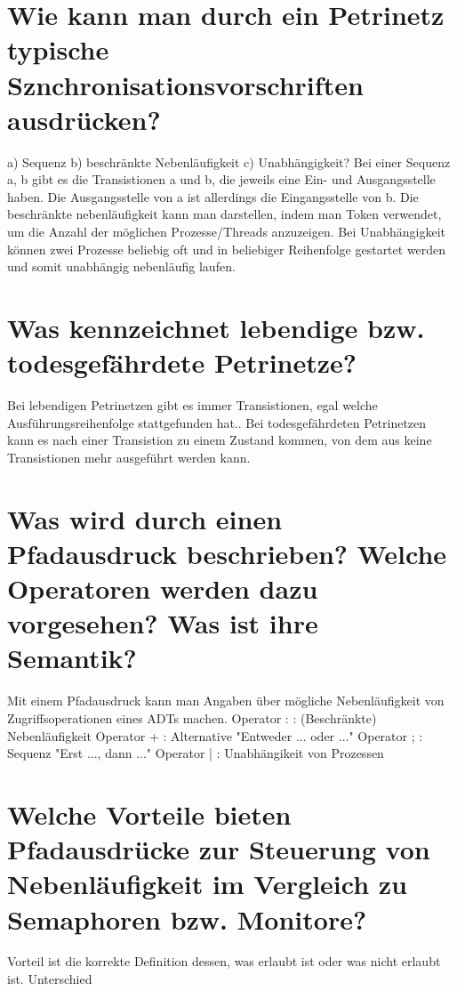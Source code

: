 \documentclass[12pt,a4paper,ngerman]{scrartcl}
\newcommand{\question}[1]{#1}
\newenvironment {answer}
                {}
                {}
\begin{document}
\section{\question{Wie kann man durch ein Petrinetz typische Sznchronisationsvorschriften ausdrücken?}}
\begin{answer}
a) Sequenz
b) beschränkte Nebenläufigkeit
c) Unabhängigkeit?
Bei einer Sequenz a, b gibt es die Transistionen a und b, die jeweils eine Ein- und Ausgangsstelle
haben. Die Ausgangsstelle von a ist allerdings die Eingangsstelle von b.
Die beschränkte nebenläufigkeit kann man darstellen, indem man Token verwendet, um die Anzahl
der möglichen Prozesse/Threads anzuzeigen.
Bei Unabhängigkeit können zwei Prozesse beliebig oft und in beliebiger Reihenfolge gestartet
werden und somit unabhängig nebenläufig laufen.
\end{answer}

\section{\question{Was kennzeichnet lebendige bzw. todesgefährdete Petrinetze?}}
\begin{answer}
Bei lebendigen Petrinetzen gibt es immer Transistionen, egal welche Ausführungsreihenfolge stattgefunden
hat..
Bei todesgefährdeten Petrinetzen kann es nach einer Transistion zu einem Zustand kommen, von
dem aus keine Transistionen mehr ausgeführt werden kann.
\end{answer}

\section{\question{Was wird durch einen Pfadausdruck beschrieben? Welche Operatoren werden dazu vorgesehen? Was ist ihre Semantik?}}
\begin{answer}
Mit einem Pfadausdruck kann man Angaben über mögliche Nebenläufigkeit von Zugriffsoperationen
eines ADTs machen.
Operator : : (Beschränkte) Nebenläufigkeit
Operator + : Alternative "Entweder ... oder ..."
Operator ; : Sequenz "Erst ..., dann ..."
Operator | : Unabhängikeit von Prozessen
\end{answer}

\section{\question{Welche Vorteile bieten Pfadausdrücke zur Steuerung von Nebenläufigkeit im Vergleich zu Semaphoren bzw. Monitore?}}
\begin{answer}
Vorteil ist die korrekte Definition dessen, was erlaubt ist oder was nicht erlaubt ist. Unterschied
\end{answer}
\end{document}
